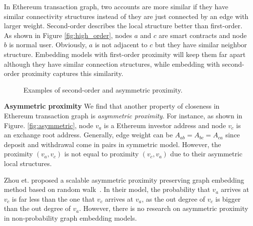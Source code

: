  In Ethereum transaction graph, two accounts are more similar if they have similar connectivity structures instead of they are just connected by an edge with larger weight. Second-order describes the local structure better than first-order. As shown in Figure \ref{fig:high_order}, nodes $a$ and $c$ are smart contracts and node $b$ is normal user. Obviously, $a$ is not adjacent to $c$  but they have similar neighbor structure. Embedding models with first-order proximity will keep them far apart although they have similar connection structures, while embedding with second-order proximity captures this similarity.


\begin{figure}[htbp]
	\centering
	\caption{Examples of second-order and asymmetric proximity.}

\end{figure}

\textbf{Asymmetric proximity}
We find that another property of closeness in Ethereum transaction graph is \emph{asymmetric proximity}. For instance, as shown in Figure. \ref{fig:asymmetric}, node $v_a$ is a Ethereum investor address and node $v_c$ is an exchange root address. Generally, edge weight can be $A_{ab}=A_{bc}=A_{ca}$ since deposit and withdrawal come in pairs in symmetric model. However, the proximity $(v_a,v_c)$ is not equal to proximity $(v_c,v_a)$ due to their asymmetric local structures.

 Zhou et. proposed a scalable asymmetric proximity preserving graph embedding method based on random walk~\cite{zhou2017scalable}. In their model, the probability that $v_a$ arrives at $v_c$ is far less than the one that $v_c$ arrives at $v_a$, as the out degree of $v_c$ is bigger than the out degree of $v_a$.
However, there is no research on asymmetric proximity in non-probability graph embedding models.





